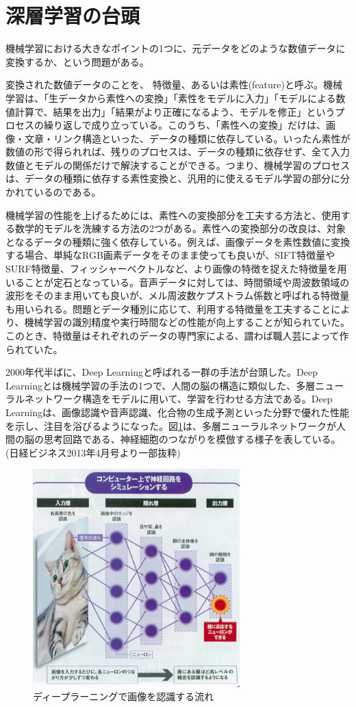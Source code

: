 \section{深層学習の台頭}
機械学習における大きなポイントの1つに、元データをどのような数値データに変換するか、という問題がある。\par
変換された数値データのことを、 特徴量、あるいは素性(feature)と呼ぶ。機械学習は、「生データから素性への変換」「素性をモデルに入力」「モデルによる数値計算で、結果を出力」「結果がより正確になるよう、モデルを修正」というプロセスの繰り返しで成り立っている。このうち、「素性への変換」だけは、画像・文章・リンク構造といった、データの種類に依存している。いったん素性が数値の形で得られれば、残りのプロセスは、データの種類に依存せず、全て入力数値とモデルの関係だけで解決することができる。つまり、機械学習のプロセスは、データの種類に依存する素性変換と、汎用的に使えるモデル学習の部分に分かれているのである。\par
機械学習の性能を上げるためには、素性への変換部分を工夫する方法と、使用する数学的モデルを洗練する方法の2つがある。素性への変換部分の改良は、対象となるデータの種類に強く依存している。例えば、画像データを素性数値に変換する場合、単純なRGB画素データをそのまま使っても良いが、SIFT特徴量やSURF特徴量、フィッシャーベクトルなど、より画像の特徴を捉えた特徴量を用いることが定石となっている。音声データに対しては、時間領域や周波数領域の波形をそのまま用いても良いが、メル周波数ケプストラム係数と呼ばれる特徴量も用いられる。問題とデータ種別に応じて、利用する特徴量を工夫することにより、機械学習の識別精度や実行時間などの性能が向上することが知られていた。このとき、特徴量はそれぞれのデータの専門家による、謂わば職人芸によって作られていた。\par
2000年代半ばに、Deep Learningと呼ばれる一群の手法が台頭した。Deep Learningとは機械学習の手法の1つで、人間の脳の構造に類似した、多層ニューラルネットワーク構造をモデルに用いて、学習を行わせる方法である。Deep Learningは、画像認識や音声認識、化合物の生成予測といった分野で優れた性能を示し、注目を浴びるようになった。図\ref{c1_nikkei}は、多層ニューラルネットワークが人間の脳の思考回路である、神経細胞のつながりを模倣する様子を表している。(日経ビジネス2013年4月号より一部抜粋)\\
\begin{figure}[tbp]
 \begin{center}
  \includegraphics[width=80mm]{img/c1/nikkei}
 \end{center}
 \caption{ディープラーニングで画像を認識する流れ}
 \label{c1_nikkei}
\end{figure}
